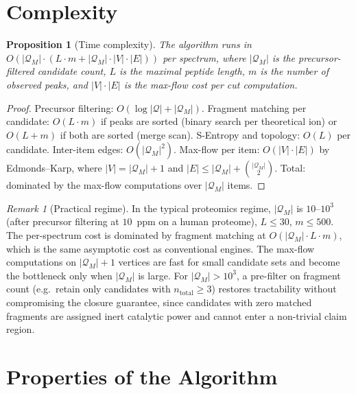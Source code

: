 \documentclass[11pt,a4paper]{article}
\newtheorem{proposition}[theorem]{Proposition}
\theoremstyle{definition}
\theoremstyle{remark}
\newtheorem{remark}[theorem]{Remark}
\newcommand{\Pep}{\mathcal{Q}}
\begin{document}
\section{Complexity}
\label{sec:complexity}

\begin{proposition}[Time complexity]
\label{prop:time}
The algorithm runs in
$O(|\Pep_M|\cdot(L\cdot m + |\Pep_M|\cdot|V|\cdot|E|))$ per spectrum,
where $|\Pep_M|$ is the precursor-filtered candidate count, $L$ is the
maximal peptide length, $m$ is the number of observed peaks,
and $|V|\cdot|E|$ is the max-flow cost per cut computation.
\end{proposition}

\begin{proof}
Precursor filtering: $O(\log|\Pep|+|\Pep_M|)$.
Fragment matching per candidate: $O(L\cdot m)$ if peaks are sorted
(binary search per theoretical ion) or $O(L+m)$ if both are sorted
(merge scan).
S-Entropy and topology: $O(L)$ per candidate.
Inter-item edges: $O(|\Pep_M|^2)$.
Max-flow per item: $O(|V|\cdot|E|)$ by Edmonds--Karp, where
$|V|=|\Pep_M|+1$ and $|E|\le|\Pep_M|+\binom{|\Pep_M|}{2}$.
Total: dominated by the max-flow computations over $|\Pep_M|$ items.
\end{proof}

\begin{remark}[Practical regime]
In the typical proteomics regime, $|\Pep_M|$ is $10$--$10^3$
(after precursor filtering at $10$~ppm on a human proteome),
$L\le 30$, $m\le 500$. The per-spectrum cost is dominated by
fragment matching at $O(|\Pep_M|\cdot L\cdot m)$, which is the
same asymptotic cost as conventional engines. The max-flow
computations on $|\Pep_M|+1$ vertices are fast for small candidate
sets and become the bottleneck only when $|\Pep_M|$ is large.
For $|\Pep_M|>10^3$, a pre-filter on fragment count (e.g.\ retain
only candidates with $n_{\mathrm{total}}\ge 3$) restores
tractability without compromising the closure guarantee, since
candidates with zero matched fragments are assigned inert catalytic
power and cannot enter a non-trivial claim region.
\end{remark}

\section{Properties of the Algorithm}
\label{sec:properties}
\end{document}
